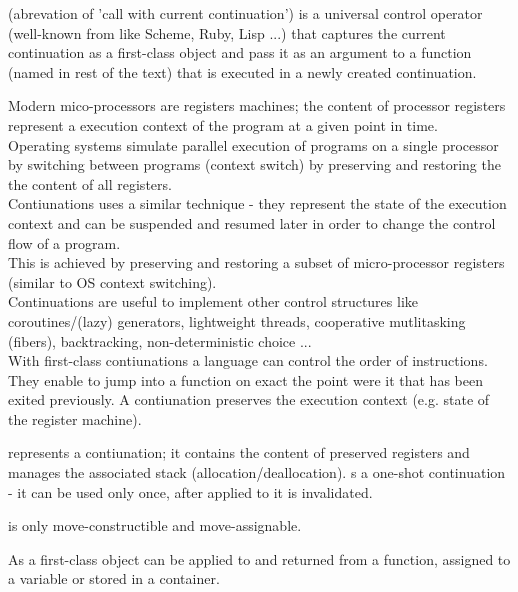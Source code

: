 
\cc (abrevation of 'call with current continuation') is a universal control
operator (well-known from like Scheme, Ruby, Lisp ...) that captures the
current continuation as a first-class object and pass it as an argument to
a function (named \contfn in rest of the text) that is executed in a newly
created continuation.



Modern mico-processors are registers machines; the content of processor
registers represent a execution context of the program at a given point in
time.\\
Operating systems simulate parallel execution of programs on a single processor
by switching between programs (context switch) by preserving and restoring the
the content of all registers.\\
Contiunations uses a similar technique - they represent the state of the
execution context and can be suspended and resumed later in order to change the
control flow of a program.\\
This is achieved by preserving and restoring a subset of micro-processor
registers (similar to OS context switching).\\
\newline
Continuations are useful to implement other control structures like
coroutines/(lazy) generators, lightweight threads, cooperative mutlitasking
(fibers), backtracking, non-deterministic choice ...\\
\newline
With first-class contiunations a language can control the order of instructions.
They enable to jump into a function on exact the point were it that has been
exited previously. A contiunation preserves the execution context (e.g. state of
the register machine).
\newline

\con represents a contiunation; it contains the content of preserved
registers and manages the associated stack (allocation/deallocation).
\con s a one-shot continuation - it can be used only once, after applied to
\resume it is invalidated.\\
\newline

\con is  only move-constructible and move-assignable.

As a first-class object \con can be applied to and returned from a function,
assigned to a variable or stored in a container.

